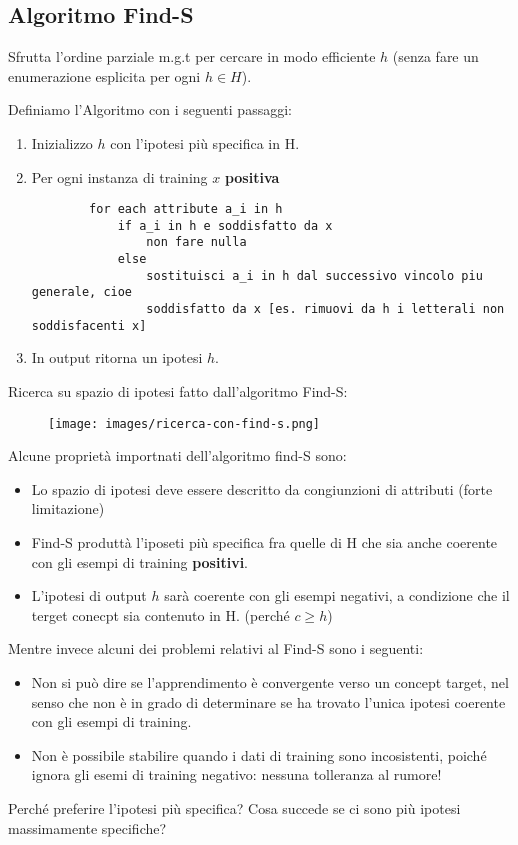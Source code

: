 \subsection{Algoritmo Find-S}
Sfrutta l'ordine parziale m.g.t per cercare in modo efficiente $h$ (senza fare un enumerazione esplicita per ogni $h \in H$).
\begin{definition}
    Definiamo l'Algoritmo con i seguenti passaggi:
    \begin{enumerate}
        \item Inizializzo $h$ con l'ipotesi più specifica in H.
        \item Per ogni instanza di training $x$ \textbf{positiva}
        \begin{lstlisting}
        for each attribute a_i in h
            if a_i in h e soddisfatto da x
                non fare nulla
            else
                sostituisci a_i in h dal successivo vincolo piu generale, cioe
                soddisfatto da x [es. rimuovi da h i letterali non soddisfacenti x]
        \end{lstlisting}
        \item In output ritorna un ipotesi $h$.
    \end{enumerate}
\end{definition}
Ricerca su spazio di ipotesi fatto dall'algoritmo Find-S:
\begin{figure}[h!]
    \centering
    \texttt{[image: images/ricerca-con-find-s.png]}
\end{figure}

\hspace{-15pt}Alcune proprietà importnati dell'algoritmo find-S sono:
\begin{itemize}
    \item Lo spazio di ipotesi deve essere descritto da congiunzioni di attributi (forte limitazione)
    \item Find-S produttà l'iposeti più specifica fra quelle di H che sia anche coerente con gli esempi di training \textbf{positivi}.
    \item L'ipotesi di output $h$ sarà coerente con gli esempi negativi, a condizione che il terget conecpt sia contenuto in H. (perché $c \geq h$)
\end{itemize}
Mentre invece alcuni dei problemi relativi al Find-S sono i seguenti:
\begin{itemize}
    \item Non si può dire se l'apprendimento è convergente verso un concept target, nel senso
    che non è in grado di determinare se ha trovato l'unica ipotesi coerente con gli esempi di training.
    \item Non è possibile stabilire quando i dati di training sono incosistenti, poiché ignora gli esemi di training negativo: nessuna tolleranza al rumore!
\end{itemize}
Perché preferire l’ipotesi più specifica? Cosa succede se ci sono più ipotesi massimamente specifiche?


